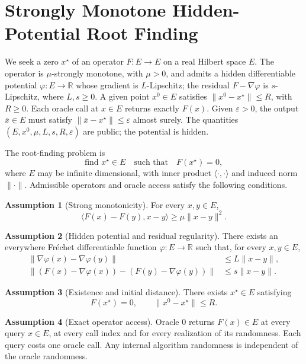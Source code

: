 \documentclass[10pt]{article}
\theoremstyle{definition}
\newtheorem{assumption}{Assumption}
\begin{document}
\section*{Strongly Monotone Hidden-Potential Root Finding}
We seek a zero $x^\star$ of an operator $F:E\to E$ on a real Hilbert space $E$. The operator is $\mu$-strongly monotone, with $\mu>0$, and admits a hidden differentiable potential $\varphi:E\to\mathbb{R}$ whose gradient is $L$-Lipschitz; the residual $F-\nabla\varphi$ is $s$-Lipschitz, where $L,s\geq0$. A given point $x^0\in E$ satisfies $\|x^0-x^\star\|\leq R$, with $R\geq0$. Each oracle call at $x\in E$ returns exactly $F(x)$. Given $\varepsilon>0$, the output $\bar{x}\in E$ must satisfy $\|\bar{x}-x^\star\|\leq\varepsilon$ almost surely. The quantities $(E,x^0,\mu,L,s,R,\varepsilon)$ are public; the potential is hidden.

The root-finding problem is
\[
\text{find }x^\star\in E\quad\text{such that}\quad F(x^\star)=0,
\]
where $E$ may be infinite dimensional, with inner product $\langle\cdot,\cdot\rangle$ and induced norm $\|\cdot\|$. Admissible operators and oracle access satisfy the following conditions.

\begin{assumption}[Strong monotonicity]
For every $x,y\in E$,
\[
\langle F(x)-F(y),x-y\rangle
\geq \mu\|x-y\|^2.
\]
\end{assumption}

\begin{assumption}[Hidden potential and residual regularity]
There exists an everywhere Fr\'echet differentiable function $\varphi:E\to\mathbb{R}$ such that, for every $x,y\in E$,
\[
\begin{aligned}
\|\nabla\varphi(x)-\nabla\varphi(y)\|
&\leq L\|x-y\|,\\
\|(F(x)-\nabla\varphi(x))-(F(y)-\nabla\varphi(y))\|
&\leq s\|x-y\|.
\end{aligned}
\]
\end{assumption}

\begin{assumption}[Existence and initial distance]
There exists $x^\star\in E$ satisfying
\[
F(x^\star)=0,
\qquad \|x^0-x^\star\|\leq R.
\]
\end{assumption}

\begin{assumption}[Exact operator access]
Oracle $0$ returns $F(x)\in E$ at every query $x\in E$, at every call index and for every realization of its randomness. Each query costs one oracle call. Any internal algorithm randomness is independent of the oracle randomness.
\end{assumption}
\end{document}
